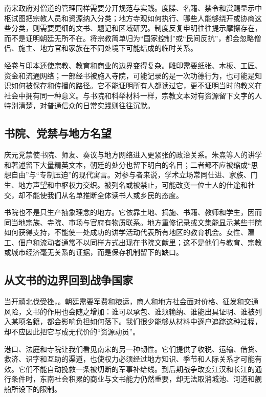 南宋政府对僧道的管理同样需要分开规范与实践。度牒、名籍、禁令和赏赐显示中枢试图把宗教人员和资源纳入分类；地方寺观如何执行、哪些人能够绕开或协商这些分类，则需要更细的文书、题记和区域研究。制度反复申明往往提示摩擦存在，而不是证明朝廷无所不在。将宗教简单归为“国家控制”或“民间反抗”，都会忽略僧侣、施主、地方官和家族在不同处境下可能结成的临时关系。

经卷与印本还使宗教、教育和商业的边界变得复杂。雕印需要纸张、木板、工匠、资金和流通网络；一部经书被施入寺院，可能记录的是一次功德行为，也可能是知识如何被保存和传播的路径。它不能证明所有人都读过它，更不证明当时的教义在社会中拥有同一种意义。与书院和科举材料一样，宗教文本对有资源留下文字的人特别清楚，对普通信众的日常实践则往往沉默。

\subsection{书院、党禁与地方名望}

庆元党禁使书院、师友、奏议与地方网络进入更紧张的政治关系。朱熹等人的讲学和著述留下大量精英文本，朝廷的处分也留下明白的名目；二者都不应被缩成“思想自由”与“专制压迫”的现代寓言。对参与者来说，学术立场常同仕进、家族、门生、地方声望和中枢权力交织。被列名或被禁止，可能改变一位士人的仕途和社交，却不能使我们从名单推断全体读书人或乡民的态度。

书院也不是只生产抽象理念的地方。它依靠土地、捐施、书籍、教师和学生，因而同当地宗族、寺院、市场与官府有物质联系。地方重修记录或文集能显示某些书院如何获得支持，不能使一处成功的讲学活动代表所有地区的教育机会。女性、雇工、佃户和流动者通常不以同样方式出现在书院文献里；这不是他们与教育、宗教或城市经济毫无关系的证据，而是保存机制留下的缺口。

\subsection{从文书的边界回到战争国家}

当开禧北伐受挫，。朝廷需要军费和粮运，商人和地方社会面对价格、征发和交通风险，文书的作用也会随之增加：谁可以承包、谁须输纳、谁能出具证明、谁被列入某项名籍，都会影响负担如何落下。我们很少能够从材料中逐户追踪这种过程，却不应因此把它写成无代价的“资源动员”。

港口、法庭和寺院让我们看见南宋的另一种韧性。它们提供了收税、运输、借贷、救济、识字和互助的渠道，也使权力必须经过地方知识、季节和人际关系才可能有效。它们不能自动挽救一条被切断的军事补给线。到后期战争改变江汉和长江的通行条件时，东南社会积累的商业与文书能力仍然重要，却无法取消城池、河道和舰船所设下的限制。
